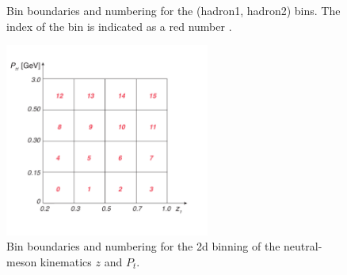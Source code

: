 \begin{figure}[H]
\captionsetup[subfloat]{farskip=2pt,captionskip=1pt}
\centering
{}
\caption{Bin boundaries and numbering for the (hadron1, hadron2) bins. The index of the bin is indicated as a red number	.}
\label{fig:binnings}
\end{figure}

\begin{figure}[H]
    \centering
    \includegraphics[width=0.6\textwidth,natwidth=250,natheight=100]{figure_dataselection/zptbin.pdf}
    \caption{Bin boundaries and numbering for the 2d binning of the neutral-meson kinematics $z$ and $P_t$.}
    \label{fig:zptbin}
\end{figure}

